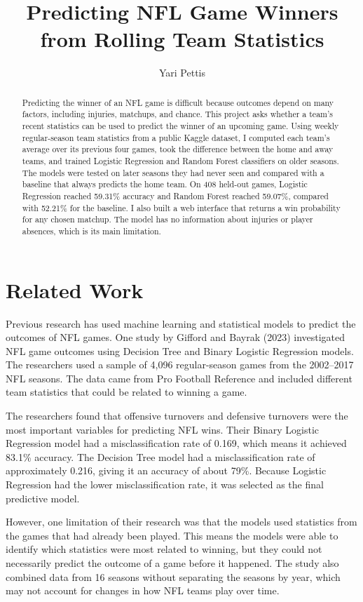 \documentclass[sigconf,nonacm]{acmart}
\title{Predicting NFL Game Winners from Rolling Team Statistics}
\author{Yari Pettis}
\affiliation{\institution{North Carolina A&T State University}}
\begin{document}
\begin{abstract}
Predicting the winner of an NFL game is difficult because outcomes depend on many factors, including injuries, matchups, and chance. This project asks whether a team's recent statistics can be used to predict the winner of an upcoming game. Using weekly regular-season team statistics from a public Kaggle dataset, I computed each team's average over its previous four games, took the difference between the home and away teams, and trained Logistic Regression and Random Forest classifiers on older seasons. The models were tested on later seasons they had never seen and compared with a baseline that always predicts the home team. On 408 held-out games, Logistic Regression reached 59.31\% accuracy and Random Forest reached 59.07\%, compared with 52.21\% for the baseline. I also built a web interface that returns a win probability for any chosen matchup. The model has no information about injuries or player absences, which is its main limitation.

\end{abstract}
\maketitle
\section{Related Work}
Previous research has used machine learning and statistical models to predict the outcomes of NFL games. One study by Gifford and Bayrak (2023) investigated NFL game outcomes using Decision Tree and Binary Logistic Regression models. The researchers used a sample of 4,096 regular-season games from the 2002--2017 NFL seasons. The data came from Pro Football Reference and included different team statistics that could be related to winning a game.

The researchers found that offensive turnovers and defensive turnovers were the most important variables for predicting NFL wins. Their Binary Logistic Regression model had a misclassification rate of 0.169, which means it achieved 83.1\% accuracy. The Decision Tree model had a misclassification rate of approximately 0.216, giving it an accuracy of about 79\%. Because Logistic Regression had the lower misclassification rate, it was selected as the final predictive model.

However, one limitation of their research was that the models used statistics from the games that had already been played. This means the models were able to identify which statistics were most related to winning, but they could not necessarily predict the outcome of a game before it happened. The study also combined data from 16 seasons without separating the seasons by year, which may not account for changes in how NFL teams play over time.
\end{document}
